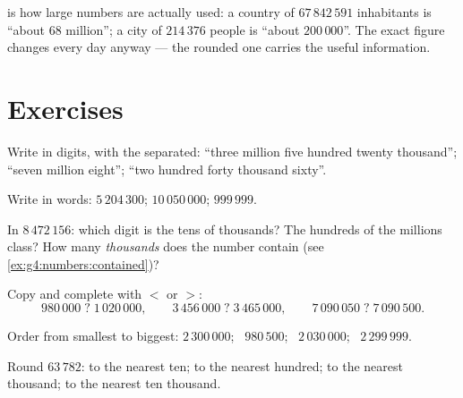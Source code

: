 \begin{example}\label{ex:g4:numbers:world}
 is how large numbers are actually used: a country of
$67\,842\,591$ inhabitants is ``about $68$ million''; a city of
$214\,376$ people is ``about $200\,000$''. The exact figure changes
every day anyway --- the rounded one carries the useful
information.
\end{example}

\section{Exercises}

\begin{exercise}[$\star$]\label{exo:g4:numbers:1}
Write in digits, with the  separated: ``three million five
hundred twenty thousand''; ``seven million eight''; ``two hundred
forty thousand sixty''.
\end{exercise}

\begin{exercise}[$\star$]\label{exo:g4:numbers:2}
Write in words: $5\,204\,300$; \quad $10\,050\,000$; \quad
$999\,999$.
\end{exercise}

\begin{exercise}[$\star$]\label{exo:g4:numbers:3}
In $8\,472\,156$: which digit is the tens of thousands? The hundreds
of the millions class? How many \emph{thousands} does the number
contain (see \cref{ex:g4:numbers:contained})?
\end{exercise}

\begin{exercise}[$\star$]\label{exo:g4:numbers:4}
Copy and complete with $<$ or $>$:
\[
980\,000 \;?\; 1\,020\,000, \qquad
3\,456\,000 \;?\; 3\,465\,000, \qquad
7\,090\,050 \;?\; 7\,090\,500 .
\]
\end{exercise}

\begin{exercise}[$\star$]\label{exo:g4:numbers:5}
Order from smallest to biggest: $2\,300\,000$; \ $980\,500$; \
$2\,030\,000$; \ $2\,299\,999$.
\end{exercise}

\begin{exercise}[$\star$]\label{exo:g4:numbers:6}
Round $63\,782$: to the nearest ten; to the nearest hundred; to the
nearest thousand; to the nearest ten thousand.
\end{exercise}

